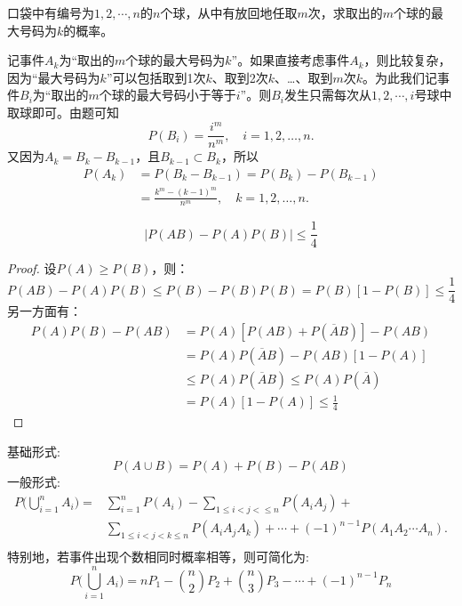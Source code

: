 \begin{example}
    口袋中有编号为$1, 2, \cdots, n$的$n$个球，从中有放回地任取$m$次，求取出的$m$个球的最大号码为$k$的概率。
\end{example}
\begin{solution}
    记事件$A_k$为“取出的$m$个球的最大号码为$k$”。如果直接考虑事件$A_k$，则比较复杂，因为“最大号码为$k$”可以包括取到1次$k$、取到2次$k$、\dots、取到$m$次$k$。为此我们记事件$B_i$为“取出的$m$个球的最大号码小于等于$i$”。则$B_i$发生只需每次从$1,2,\cdots ,i$号球中取球即可。由题可知
    \[  P(B_i) = \frac{i^m}{n^m}, \quad i = 1, 2, \dotsc, n. \]
    又因为$A_k = B_k - B_{k-1}$，且$B_{k-1} \subset B_k$，所以
    \begin{align*}
        P(A_k) & = P(B_k - B_{k-1}) = P(B_k) - P(B_{k-1})                 \\
               & = \frac{k^m - (k - 1)^m}{n^m}, \quad k = 1,2, \dotsc, n.
    \end{align*}
\end{solution}

\begin{proposition}[]\label{prop:inequality_event}
    \[ \lvert P(AB) - P(A)P(B) \rvert \le \frac1{4} \]
\end{proposition}
\begin{proof}
    设$P(A)\ge P(B)$，则：
    \[ P(AB)-P(A)P(B)\le P(B)-P(B)P(B)=P(B)[1-P(B)]\le \frac1{4} \]
    另一方面有：
    \begin{align*}
        P(A)P(B)-P(AB) & =P(A)[P(AB)+P(\overline{A}B)]-P(AB)              \\
                       & =P(A)P(\overline{A}B)-P(AB)[1-P(A)]              \\
                       & \le P(A)P(\overline{A}B) \le P(A)P(\overline{A}) \\
                       & =P(A)[1-P(A)]\le \frac1{4}
    \end{align*}
\end{proof}

\begin{proposition}[加法公式]\label{pro:addition_law}
    基础形式:
    \[ P(A \cup B) = P(A) + P(B) - P(AB) \]
    一般形式:
    \begin{align*}
        P\biggl(\bigcup_{i=1}^n A_i \biggr)= & \sum_{i=1}^n P(A_i) - \sum_{1\le i < j < \le n}P(A_i A_j)+                              \\
                                             & \sum_{1 \le i < j < k \le n} P(A_i A_j A_k)+ \dotsb + (-1)^{n-1} P(A_1 A_2 \dotsb A_n). \\
    \end{align*}
    特别地，若事件出现个数相同时概率相等，则可简化为:
    \[ P\biggl( \bigcup_{i=1}^n A_i \biggr)=n P_{1} - \binom{n}{2} P_{2} + \binom{n}{3} P_{3}- \cdots+(-1)^{n-1} P_{n} \]
\end{proposition}

